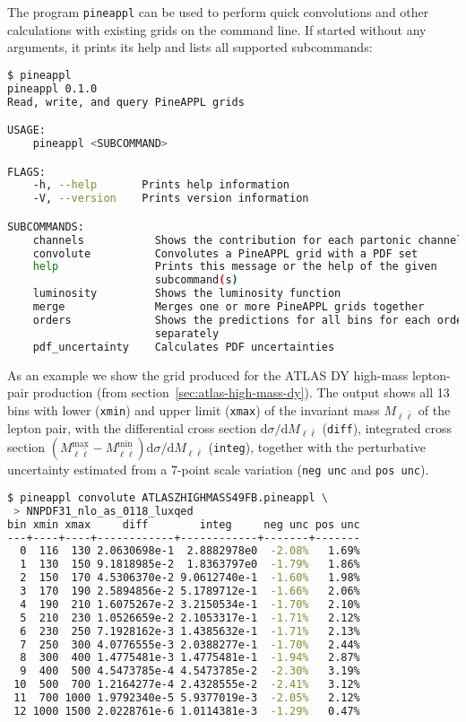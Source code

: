 The program \texttt{pineappl} can be used to perform quick convolutions and other calculations with existing grids on the command line.
If started without any arguments, it prints its help and lists all supported subcommands:
\begin{lstlisting}[language=bash]
 $ pineappl
pineappl 0.1.0
Read, write, and query PineAPPL grids

USAGE:
    pineappl <SUBCOMMAND>

FLAGS:
    -h, --help       Prints help information
    -V, --version    Prints version information

SUBCOMMANDS:
    channels           Shows the contribution for each partonic channel
    convolute          Convolutes a PineAPPL grid with a PDF set
    help               Prints this message or the help of the given
                       subcommand(s)
    luminosity         Shows the luminosity function
    merge              Merges one or more PineAPPL grids together
    orders             Shows the predictions for all bins for each order
                       separately
    pdf_uncertainty    Calculates PDF uncertainties
\end{lstlisting}
As an example we show the grid produced for the ATLAS DY high-mass lepton-pair production (from section~\ref{sec:atlas-high-mass-dy}).
The output shows all 13 bins with lower (\texttt{xmin}) and upper limit (\texttt{xmax}) of the invariant mass $M_{\ell \bar{\ell}}$ of the lepton pair, with the differential cross section $\mathrm{d} \sigma / \mathrm{d} M_{\ell \bar{\ell}}$ (\texttt{diff}), integrated cross section $(M_{\ell \bar{\ell}}^\mathrm{max} - M_{\ell \bar{\ell}}^\mathrm{min}) \mathrm{d} \sigma / \mathrm{d} M_{\ell \bar{\ell}}$ (\texttt{integ}), together with the perturbative uncertainty estimated from a 7-point scale variation (\texttt{neg unc} and \texttt{pos unc}).
\begin{lstlisting}[language=bash]
 $ pineappl convolute ATLASZHIGHMASS49FB.pineappl \
 > NNPDF31_nlo_as_0118_luxqed
bin xmin xmax     diff        integ     neg unc pos unc
---+----+----+------------+------------+-------+-------
  0  116  130 2.0630698e-1  2.8882978e0  -2.08%   1.69%
  1  130  150 9.1818985e-2  1.8363797e0  -1.79%   1.86%
  2  150  170 4.5306370e-2 9.0612740e-1  -1.60%   1.98%
  3  170  190 2.5894856e-2 5.1789712e-1  -1.66%   2.06%
  4  190  210 1.6075267e-2 3.2150534e-1  -1.70%   2.10%
  5  210  230 1.0526659e-2 2.1053317e-1  -1.71%   2.12%
  6  230  250 7.1928162e-3 1.4385632e-1  -1.71%   2.13%
  7  250  300 4.0776555e-3 2.0388277e-1  -1.70%   2.44%
  8  300  400 1.4775481e-3 1.4775481e-1  -1.94%   2.87%
  9  400  500 4.5473785e-4 4.5473785e-2  -2.30%   3.19%
 10  500  700 1.2164277e-4 2.4328555e-2  -2.41%   3.12%
 11  700 1000 1.9792340e-5 5.9377019e-3  -2.05%   2.12%
 12 1000 1500 2.0228761e-6 1.0114381e-3  -1.29%   0.47%
\end{lstlisting}

